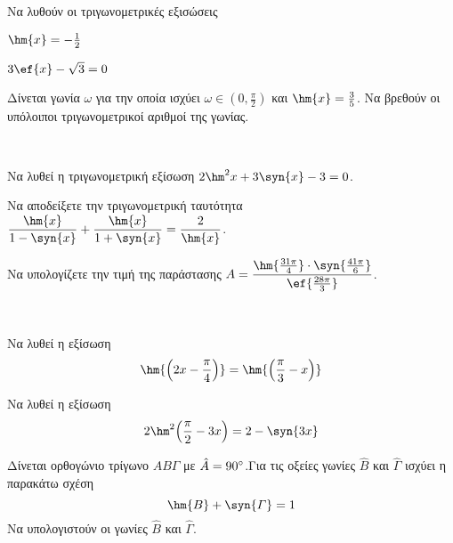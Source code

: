 \documentclass[twoside,nofonts,ektypwsh]{frontisthrio-diag}
\begin{document}
\begin{thema}
\begin{erwthma}
\begin{multicols}{2}
\begin{alist}
\end{alist}
\end{multicols}
\item Να λυθούν οι τριγωνομετρικές εξισώσεις
\begin{multicols}{2}
\begin{alist}
\item $\hm{x}=-\frac{1}{2}$
\item $3\ef{x}-\sqrt{3}=0$
\end{alist}
\end{multicols}
\item Δίνεται γωνία $\omega$ για την οποία ισχύει $\omega\in\left(0,\frac{\pi}{2}\right)$ και $\hm{x}=\frac{3}{5}$. Να βρεθούν οι υπόλοιποι τριγωνομετρικοί αριθμοί της γωνίας.
\end{erwthma}
\item\mbox{}\\
\vspace{-7mm}
\begin{erwthma}
\item Να λυθεί η τριγωνομετρική εξίσωση $2\hm^2{x}+3\syn{x}-3=0$.
\item Να αποδείξετε την τριγωνομετρική ταυτότητα $\dfrac{\hm{x}}{1-\syn{x}}+\dfrac{\hm{x}}{1+\syn{x}}=\dfrac{2}{\hm{x}}$.
\item Να υπολογίζετε την τιμή της παράστασης $A=\dfrac{\hm{\frac{31\pi}{4}}\cdot\syn{\frac{41\pi}{6}}}{\ef{\frac{28\pi}{3}}}$.
\end{erwthma}
\item\mbox{}\\
\vspace{-7mm}
\begin{erwthma}
\item Να λυθεί η εξίσωση
\[\hm{\left(2x-\frac{\pi}{4}\right)}=\hm{\left(\frac{\pi}{3}-x\right)}\]
\item Να λυθεί η εξίσωση
\[2\hm^2{\left(\frac{\pi}{2}-3x\right)}=2-\syn{3x}\]
\item Δίνεται ορθογώνιο τρίγωνο $AB\varGamma$ με $\hat{A}=90\degree$.Για τις οξείες γωνίες $\hat{B}$ και $\hat{\varGamma}$ ισχύει η παρακάτω σχέση
\[\hm{B}+\syn{\varGamma}=1\]
Να υπολογιστούν οι γωνίες $\hat{B}$ και $\hat{\varGamma}$.
\end{erwthma}

\end{thema}
\end{document}
